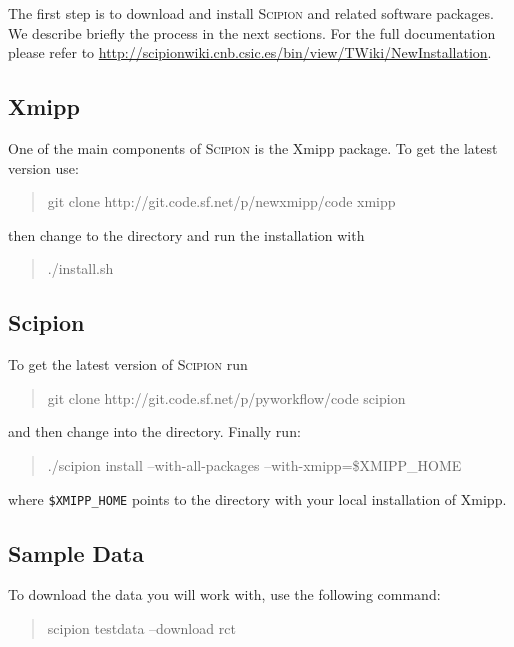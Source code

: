 \documentclass[12pt]{article} %
\newcommand{\scipion}{\textsc{Scipion} }
\newenvironment{command}{\tt\begin{quote}}{\end{quote}}
\begin{document}
The first step is to download and install \scipion and related
software packages. We describe briefly the process in the next
sections. For the full documentation please refer to
\url{http://scipionwiki.cnb.csic.es/bin/view/TWiki/NewInstallation}.

\subsection{Xmipp}

One of the main components of \scipion is the Xmipp package. To get
the latest version use:

\begin{command}
git clone http://git.code.sf.net/p/newxmipp/code xmipp
\end{command}

\noindent
then change to the  directory and run the installation with

\begin{command}
./install.sh
\end{command}

\subsection{Scipion}

To get the latest version of \scipion run

\begin{command}
git clone http://git.code.sf.net/p/pyworkflow/code scipion
\end{command}

\noindent
and then change into the  directory. Finally run:

\begin{command}
./scipion install --with-all-packages --with-xmipp=\$XMIPP\_HOME
\end{command}

\noindent
where \verb+$XMIPP_HOME+ points to the directory with your local
installation of Xmipp.

\subsection{Sample Data}

To download the data you will work with, use the following command:

\begin{command}
scipion testdata --download rct
\end{command}
\end{document}
